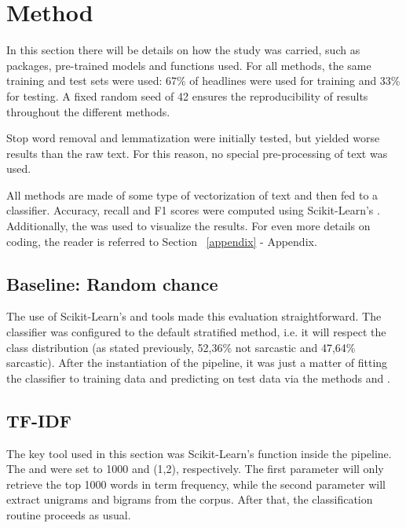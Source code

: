 \thispagestyle{plain}

\section{Method}

In this section there will be details on how the study was carried, such as packages, pre-trained models and functions used. For all methods, the same training and test sets were used: 67\% of headlines were used for training and 33\% for testing. A fixed random seed of 42 ensures the reproducibility of results throughout the different methods. 

Stop word removal and lemmatization were initially tested, but yielded worse results than the raw text. For this reason, no special pre-processing of text was used.

All methods are made of some type of vectorization of text and then fed to a  classifier. Accuracy, recall and F1 scores were computed using Scikit-Learn's  . Additionally, the  was used to visualize the results. For even more details on coding, the reader is referred to Section ~\ref{appendix} - Appendix.

\subsection{Baseline: Random chance}

The use of Scikit-Learn's  and  tools made this evaluation straightforward. The classifier was configured to the default stratified method, i.e. it will respect the class distribution (as stated previously, 52,36\% not sarcastic and 47,64\% sarcastic). After the instantiation of the pipeline, it was just a matter of fitting the classifier to training data and predicting on test data via the methods  and .

\subsection{TF-IDF}

The key tool used in this section was Scikit-Learn's  function inside the pipeline. The  and  were set to 1000 and (1,2), respectively. The first parameter will only retrieve the top 1000 words in term frequency, while the second parameter will extract unigrams and bigrams from the corpus. After that, the classification routine proceeds as usual.

